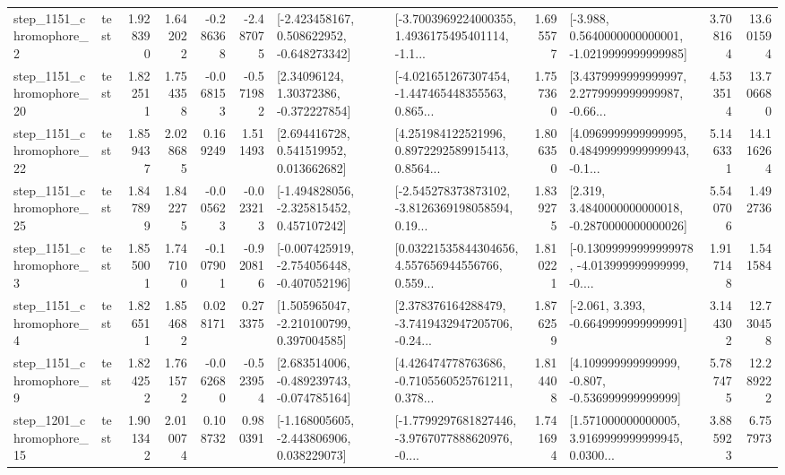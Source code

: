 \begin{tabular}{llrrrrllrlrr}
  step\_1151\_chromophore\_2 &      test &      1.928390 &    1.642022 &     -0.286368 & -2.487075 &   [-2.423458167, 0.508622952, -0.648273342] &  [-3.7003969224000355, 1.4936175495401114, -1.1... &       1.695577 &  [-3.988, 0.5640000000000001, -1.0219999999999985] &            3.708164 &         13.601594 \\
 step\_1151\_chromophore\_20 &      test &      1.822511 &    1.754358 &     -0.068153 & -0.571982 &      [2.34096124, 1.30372386, -0.372227854] &  [-4.021651267307454, -1.447465448355563, 0.865... &       1.757360 &  [3.4379999999999997, 2.2779999999999987, -0.66... &            4.533514 &         13.706680 \\
 step\_1151\_chromophore\_22 &      test &      1.859437 &    2.028685 &      0.169249 &  1.511493 &     [2.694416728, 0.541519952, 0.013662682] &  [4.251984122521996, 0.8972292589915413, 0.8564... &       1.806350 &  [4.0969999999999995, 0.48499999999999943, -0.1... &            5.146331 &         14.116264 \\
 step\_1151\_chromophore\_25 &      test &      1.847899 &    1.842275 &     -0.005623 & -0.023213 &   [-1.494828056, -2.325815452, 0.457107242] &  [-2.545278373873102, -3.8126369198058594, 0.19... &       1.839275 &   [2.319, 3.4840000000000018, -0.2870000000000026] &            5.540706 &          1.492736 \\
  step\_1151\_chromophore\_3 &      test &      1.855001 &    1.747100 &     -0.107901 & -0.920816 &  [-0.007425919, -2.754056448, -0.407052196] &  [0.03221535844304656, 4.557656944556766, 0.559... &       1.810221 &  [-0.13099999999999978, -4.013999999999999, -0.... &            1.917148 &          1.541584 \\
  step\_1151\_chromophore\_4 &      test &      1.826511 &    1.854682 &      0.028171 &  0.273375 &    [1.505965047, -2.210100799, 0.397004585] &  [2.378376164288479, -3.7419432947205706, -0.24... &       1.876259 &               [-2.061, 3.393, -0.6649999999999991] &            3.144302 &         12.730458 \\
  step\_1151\_chromophore\_9 &      test &      1.824252 &    1.761572 &     -0.062680 & -0.523954 &   [2.683514006, -0.489239743, -0.074785164] &  [4.426474778763686, -0.7105560525761211, 0.378... &       1.814408 &    [4.109999999999999, -0.807, -0.536999999999999] &            5.787475 &         12.289222 \\
 step\_1201\_chromophore\_15 &      test &      1.901342 &    2.010074 &      0.108732 &  0.980391 &   [-1.168005605, -2.443806906, 0.038229073] &  [-1.7799297681827446, -3.9767077888620976, -0.... &       1.741694 &  [1.571000000000005, 3.9169999999999945, 0.0300... &            3.885923 &          6.757973 \\

\end{tabular}
